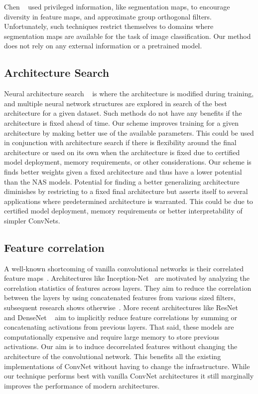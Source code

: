 Chen \etal ~\cite{Chen2017TrainingGO} used privileged information, like segmentation maps, to encourage diversity in feature maps, and approximate group orthogonal filters.
Unfortunately, such techniques restrict themselves to domains where segmentation maps are available for the task of image classification. 
Our method does not rely on any external information or a pretrained model.

\subsection{Architecture Search } 

Neural architecture search ~\cite{Liu2017ProgressiveNA, Real2018RegularizedEF, Zoph2016NeuralAS} is where the architecture is modified during training, and multiple neural network structures are explored in search of the best architecture for a given dataset. 
Such methods do not have any benefits if the architecture is fixed ahead of time. Our scheme improves training for a given architecture by making better use of the available parameters. 
This could be used in conjunction with architecture search if there is flexibility around the final architecture or used on its own when the architecture is fixed due to certified model deployment, memory requirements, or other considerations.
Our scheme is finds better weights given a fixed architecture and thus have a lower potential than the NAS models.
Potential for finding a better generalizing architecture diminishes by restricting to a fixed final architecture but asserts itself to several applications where predetermined architecture is warranted.
This could be due to certified model deployment, memory requirements or better interpretability of simpler ConvNets.

\subsection{Feature correlation } 
A well-known shortcoming of vanilla convolutional networks is their correlated feature maps~\cite{Cogswell2015ReducingOI, Glorot2010UnderstandingTD}.
Architectures like Inception-Net~\cite{Szegedy2015GoingDW} are motivated by analyzing the correlation statistics of features across layers.
They aim to reduce the correlation between the layers by using concatenated features from various sized filters, subsequent research shows otherwise~\cite{Raghu2017SVCCASV}.
More recent architectures like ResNet~\cite{he2015deep} and DenseNet ~\cite{Huang2017DenselyCC} aim to implicitly reduce feature correlations by summing or concatenating activations from previous layers.
That said, these models are computationally expensive and require large memory to store previous activations.
Our aim is to induce decorrelated features without changing the architecture of the convolutional network.
This benefits all the existing implementations of ConvNet without having to change the infrastructure.
While our technique performs best with vanilla ConvNet architectures it still marginally improves the performance of modern architectures.

